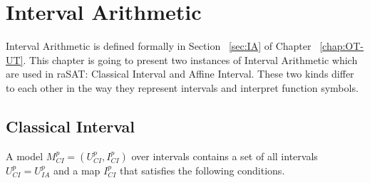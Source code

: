 \chapter{Interval Arithmetic}
Interval Arithmetic is defined formally in Section ~\ref{sec:IA} of Chapter ~\ref{chap:OT-UT}. This chapter is going to present two instances of Interval Arithmetic which are used in raSAT: Classical Interval and Affine Interval. These two kinds differ to each other in the way they represent intervals and interpret function symbols.

\section{Classical Interval}
A model $M^p_{CI} = (U^p_{CI}, I^p_{CI})$ over intervals contains a set of all intervals $U^p_{CI} = U^p_{IA}$ and a map $I^p_{CI}$ that satisfies the following conditions.
